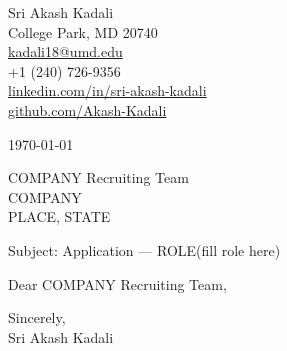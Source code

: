 \documentclass[11pt]{article}
\begin{document}

\noindent
Sri Akash Kadali \\
College Park, MD 20740 \\
\href{mailto:kadali18@umd.edu}{kadali18@umd.edu} \\
+1 (240) 726-9356 \\
\href{https://www.linkedin.com/in/sri-akash-kadali/}{linkedin.com/in/sri-akash-kadali} \\
\href{https://github.com/Akash-Kadali}{github.com/Akash-Kadali}

\vspace{0.4cm}
\noindent \today

\vspace{0.4cm}
\noindent
COMPANY Recruiting Team \\
COMPANY \\
PLACE, STATE

\vspace{0.4cm}
\noindent
Subject: Application — ROLE(fill role here)

\vspace{0.3cm}
Dear COMPANY Recruiting Team,


\vspace{0.4cm}
\noindent
Sincerely, \\
Sri Akash Kadali
\end{document}
